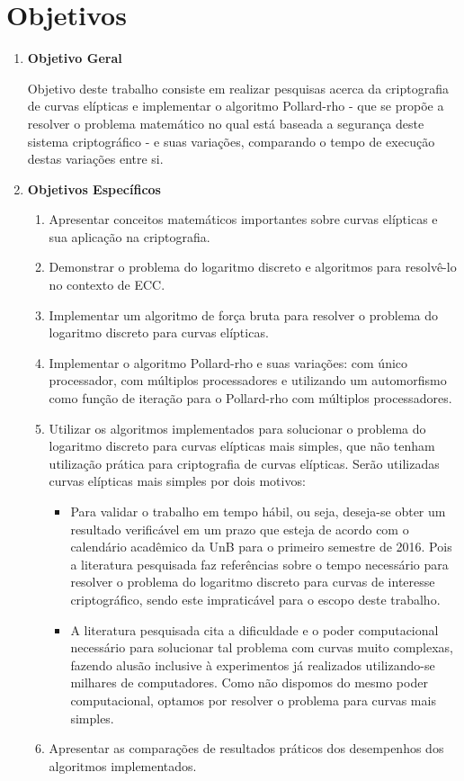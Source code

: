 \section*{Objetivos}
\begin{enumerate}
	\item \textbf{Objetivo Geral}

Objetivo deste trabalho consiste em realizar pesquisas acerca da criptografia de curvas elípticas e implementar o algoritmo Pollard-rho - que se propõe a resolver o problema matemático no qual está baseada a segurança deste sistema criptográfico - e suas variações, comparando o tempo de execução destas variações entre si.

	\item \textbf{Objetivos Específicos}
	\begin{enumerate}
		\item Apresentar conceitos matemáticos importantes sobre curvas elípticas e sua aplicação na criptografia.
		\item Demonstrar o problema do logaritmo discreto e algoritmos para resolvê-lo no contexto de ECC.
		\item Implementar um algoritmo de força bruta para resolver o problema do logaritmo discreto para curvas elípticas.
		\item Implementar o algoritmo Pollard-rho e suas variações: com único processador, com múltiplos processadores e utilizando um automorfismo como função de iteração para o Pollard-rho com múltiplos processadores.
		\item Utilizar os algoritmos implementados para solucionar o problema do logaritmo discreto para curvas elípticas mais simples, que não tenham utilização prática para criptografia de curvas elípticas. Serão utilizadas curvas elípticas mais simples por dois motivos:
		\begin{itemize}
			\item Para validar o trabalho em tempo hábil, ou seja, deseja-se obter um resultado verificável em um prazo que esteja de acordo com o calendário acadêmico da UnB para o primeiro semestre de 2016. Pois a literatura pesquisada faz referências sobre o tempo necessário para resolver o problema do logaritmo discreto para curvas de interesse criptográfico, sendo este impraticável para o escopo deste trabalho.
			\item A literatura pesquisada cita a dificuldade e o poder computacional necessário para solucionar tal problema com curvas muito complexas, fazendo alusão inclusive à experimentos já realizados utilizando-se milhares de computadores. Como não dispomos do mesmo poder computacional, optamos por resolver o problema para curvas mais simples.
		\end{itemize}
		\item Apresentar as comparações de resultados práticos dos desempenhos dos algoritmos implementados.
	\end{enumerate}
\end{enumerate}
